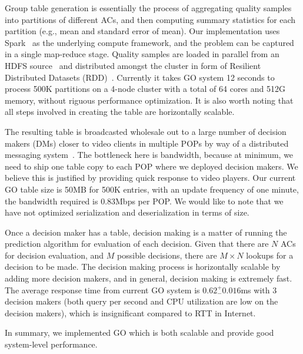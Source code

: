  Group table generation is essentially the process of aggregating quality samples into partitions of different ACs, and then computing summary statistics for each partition (e.g., mean and standard error of mean).
Our implementation uses Spark~\cite{spark} as the underlying compute framework, and the problem can be captured in a single map-reduce stage. 
Quality samples are loaded in parallel from an HDFS source~\cite{hadoop} and distributed amongst the cluster in form of Resilient Distributed Datasets (RDD)~\cite{zaharia2012resilient}. 
Currently it takes GO system 12 seconds to process 500K partitions on a 4-node cluster with a total of 64 cores and 512G memory, without riguous performance optimization.
It is also worth noting that all steps involved in creating the table are horizontally scalable.


 The resulting table is broadcasted wholesale out to a large number of decision makers (DMs) closer to video clients in multiple POPs by way of a distributed messaging system~\cite{kreps2011kafka}. The bottleneck here is bandwidth, because at minimum, we need to ship one table copy to each POP where we deployed decision makers. We believe this is justified by providing quick response to video players. Our current GO table size is 50MB for 500K entries, with an update frequency of one minute, the bandwidth required is 0.83Mbps per POP. We would like to note that we have not optimized serialization and deserialization in terms of size.

 Once a decision maker has a table, decision making is a matter of running the prediction algorithm for evaluation of each decision. Given that there are $N$ ACs for decision evaluation, and $M$ possible decisions, there are $M \times N$ lookups for a decision to be made. The decision making process is horizontally scalable by adding more decision makers, and in general, decision making is extremely fast. The average response time from current GO system is $0.62 ^{+}_{-} 0.016$ms with 3 decision makers (both query per second and CPU utilization are low on the decision makers), which is insignificant compared to RTT in Internet.

In summary, we implemented GO which is both scalable and provide good system-level performance.



